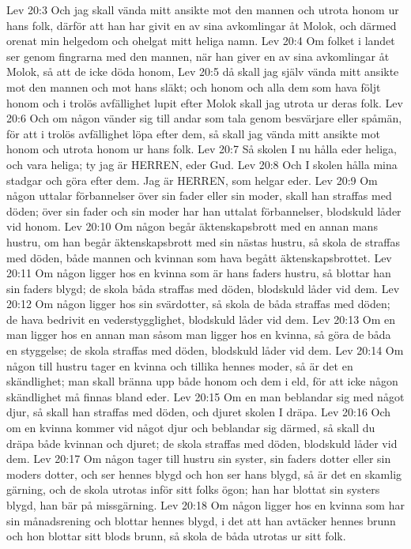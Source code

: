 Lev 20:3  Och jag skall vända mitt ansikte mot den mannen och utrota honom ur hans folk, därför att han har givit en av sina avkomlingar åt Molok, och därmed orenat min helgedom och ohelgat mitt heliga namn.
Lev 20:4  Om folket i landet ser genom fingrarna med den mannen, när han giver en av sina avkomlingar åt Molok, så att de icke döda honom,
Lev 20:5  då skall jag själv vända mitt ansikte mot den mannen och mot hans släkt; och honom och alla dem som hava följt honom och i trolös avfällighet lupit efter Molok skall jag utrota ur deras folk.
Lev 20:6  Och om någon vänder sig till andar som tala genom besvärjare eller spåmän, för att i trolös avfällighet löpa efter dem, så skall jag vända mitt ansikte mot honom och utrota honom ur hans folk.
Lev 20:7  Så skolen I nu hålla eder heliga, och vara heliga; ty jag är HERREN, eder Gud.
Lev 20:8  Och I skolen hålla mina stadgar och göra efter dem. Jag är HERREN, som helgar eder.
Lev 20:9  Om någon uttalar förbannelser över sin fader eller sin moder, skall han straffas med döden; över sin fader och sin moder har han uttalat förbannelser, blodskuld låder vid honom.
Lev 20:10  Om någon begår äktenskapsbrott med en annan mans hustru, om han begår äktenskapsbrott med sin nästas hustru, så skola de straffas med döden, både mannen och kvinnan som hava begått äktenskapsbrottet.
Lev 20:11  Om någon ligger hos en kvinna som är hans faders hustru, så blottar han sin faders blygd; de skola båda straffas med döden, blodskuld låder vid dem.
Lev 20:12  Om någon ligger hos sin svärdotter, så skola de båda straffas med döden; de hava bedrivit en vederstygglighet, blodskuld låder vid dem.
Lev 20:13  Om en man ligger hos en annan man såsom man ligger hos en kvinna, så göra de båda en styggelse; de skola straffas med döden, blodskuld låder vid dem.
Lev 20:14  Om någon till hustru tager en kvinna och tillika hennes moder, så är det en skändlighet; man skall bränna upp både honom och dem i eld, för att icke någon skändlighet må finnas bland eder.
Lev 20:15  Om en man beblandar sig med något djur, så skall han straffas med döden, och djuret skolen I dräpa.
Lev 20:16  Och om en kvinna kommer vid något djur och beblandar sig därmed, så skall du dräpa både kvinnan och djuret; de skola straffas med döden, blodskuld låder vid dem.
Lev 20:17  Om någon tager till hustru sin syster, sin faders dotter eller sin moders dotter, och ser hennes blygd och hon ser hans blygd, så är det en skamlig gärning, och de skola utrotas inför sitt folks ögon; han har blottat sin systers blygd, han bär på missgärning.
Lev 20:18  Om någon ligger hos en kvinna som har sin månadsrening och blottar hennes blygd, i det att han avtäcker hennes brunn och hon blottar sitt blods brunn, så skola de båda utrotas ur sitt folk.
